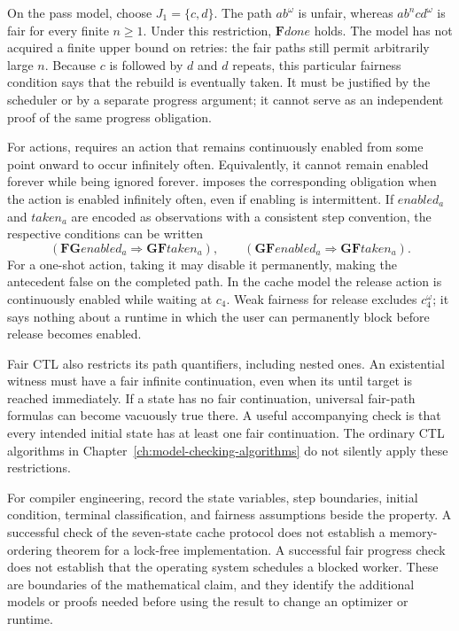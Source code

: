 On the pass model, choose $J_1=\{c,d\}$.
The path $ab^\omega$ is unfair, whereas $ab^nc d^\omega$ is fair for every finite $n\geq1$.
Under this restriction, $\mathbf{F}\mathit{done}$ holds.
The model has not acquired a finite upper bound on retries: the fair paths still permit arbitrarily large $n$.
Because $c$ is followed by $d$ and $d$ repeats, this particular fairness condition says that the rebuild is eventually taken.
It must be justified by the scheduler or by a separate progress argument; it cannot serve as an independent proof of the same progress obligation.

For actions,  requires an action that remains continuously enabled from some point onward to occur infinitely often.
Equivalently, it cannot remain enabled forever while being ignored forever.
 imposes the corresponding obligation when the action is enabled infinitely often, even if enabling is intermittent.
If $\mathit{enabled}_a$ and $\mathit{taken}_a$ are encoded as observations with a consistent step convention, the respective conditions can be written
\[
 (\mathbf{F}\mathbf{G}\mathit{enabled}_a\Rightarrow\mathbf{G}\mathbf{F}\mathit{taken}_a),
 \qquad
 (\mathbf{G}\mathbf{F}\mathit{enabled}_a\Rightarrow\mathbf{G}\mathbf{F}\mathit{taken}_a).
\]
For a one-shot action, taking it may disable it permanently, making the antecedent false on the completed path.
In the cache model the release action is continuously enabled while waiting at $c_4$.
Weak fairness for release excludes $c_4^\omega$; it says nothing about a runtime in which the user can permanently block before release becomes enabled.

Fair CTL also restricts its path quantifiers, including nested ones.
An existential witness must have a fair infinite continuation, even when its until target is reached immediately.
If a state has no fair continuation, universal fair-path formulas can become vacuously true there.
A useful accompanying check is that every intended initial state has at least one fair continuation.
The ordinary CTL algorithms in Chapter~\ref{ch:model-checking-algorithms} do not silently apply these restrictions.

For compiler engineering, record the state variables, step boundaries, initial condition, terminal classification, and fairness assumptions beside the property.
A successful check of the seven-state cache protocol does not establish a memory-ordering theorem for a lock-free implementation.
A successful fair progress check does not establish that the operating system schedules a blocked worker.
These are boundaries of the mathematical claim, and they identify the additional models or proofs needed before using the result to change an optimizer or runtime.


